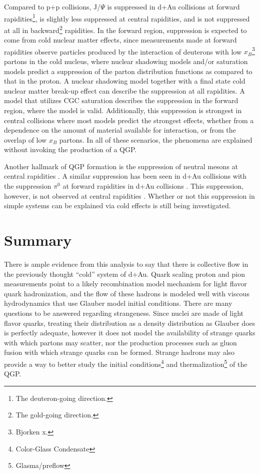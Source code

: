 Compared to p+p collisions, J/$\Psi$ is suppressed in d+Au collisions \citep{Adare:2010fn} at forward rapidities\footnote{The deuteron-going direction.}, is slightly less suppressed at central rapidities, and is not suppressed at all in backward\footnote{The gold-going direction.} rapidities. In the forward region, suppression is expected to come from cold nuclear matter effects, since measurements made at forward rapidities observe particles produced by the interaction of deuterons with low $x_{B}$\footnote{Bjorken x.} partons in the cold nucleus, where nuclear shadowing models and/or saturation models predict a suppression of the parton distribution functions as compared to that in the proton. A nuclear shadowing model together with a final state cold nuclear matter break-up effect can describe the suppression at all rapidities. A model that utilizes CGC saturation describes the suppression in the forward region, where the model is valid. Additionally, this suppression is strongest in central collisions where most models predict the strongest effects, whether from a dependence on the amount of material available for interaction, or from the overlap of low $x_{B}$ partons. In all of these scenarios, the phenomena are explained without invoking the production of a QGP.

Another hallmark of QGP formation is the suppression of neutral mesons at central rapidities \citep{Adler:2003qi}. A similar suppression has been seen in d+Au collisions with the suppression $\pi^{0}$ at forward rapidities in d+Au collisions \citep{PhysRevLett.93.242303}. This suppression, however, is not observed at central rapidities \citep{Adler:2006wg}. Whether or not this suppression in simple systems can be explained via cold effects is still being investigated.

\section{Summary}
There is ample evidence from this analysis to say that there is collective flow in the previously thought ``cold'' system of d+Au. Quark scaling proton and pion measurements point to a likely recombination model mechanism for light flavor quark hadronization, and the flow of these hadrons is modeled well with viscous hydrodynamics that use Glauber model initial conditions. There are many questions to be answered regarding strangeness. Since nuclei are made of light flavor quarks, treating their distribution as a density distribution as Glauber does is perfectly adequate, however it does not model the availability of strange quarks with which partons may scatter, nor the production processes such as gluon fusion with which strange quarks can be formed. Strange hadrons may also provide a way to better study the initial conditions\footnote{Color-Glass Condensate} and thermalization\footnote{Glasma/preflow} of the QGP. 

